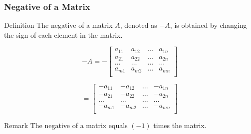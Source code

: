 \documentclass{beamer}
\begin{document}
\begin{frame}
  \frametitle{Negative of a Matrix}

  \begin{block}{Definition}
    The negative of a matrix \(A\), denoted as \(-A\), is obtained by changing the sign of each element in the matrix.

    \[
      -A = -\begin{bmatrix}
        a_{11} & a_{12} & \ldots & a_{1n} \\
        a_{21} & a_{22} & \ldots & a_{2n} \\
        \ldots & \ldots & \ldots & \ldots \\
        a_{m1} & a_{m2} & \ldots & a_{mn} \\
      \end{bmatrix}
    \]
    
    \[
      = \begin{bmatrix}
        -a_{11} & -a_{12} & \ldots & -a_{1n} \\
        -a_{21} & -a_{22} & \ldots & -a_{2n} \\
         \ldots & \ldots & \ldots & \ldots \\
        -a_{m1} & -a_{m2} & \ldots & -a_{mn} \\
      \end{bmatrix}
    \]
  \end{block}

  \pause

  \begin{block}{Remark}
    The negative of a matrix equals $(-1)$ times the matrix.
  \end{block}

\end{frame}
\end{document}
